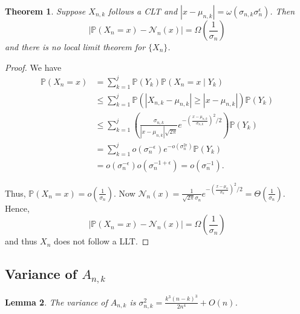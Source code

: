 \documentclass[12pt]{article} %
\newcommand{\p}[1]{\left(#1\right)}
\newcommand{\abs}[1]{\left\lvert#1\right\rvert}
\renewcommand{\P}{\mathbb{P}}
\newtheorem{thm}{Theorem}[section]
\newtheorem{lem}[thm]{Lemma}
\theoremstyle{definition}
\theoremstyle{definition}
\begin{document}
\begin{thm}
Suppose $X_{n,k}$ follows a CLT and $\abs{x - \mu_{n,k}} = \omega(\sigma_{n,k} \sigma_n^{\epsilon})$. Then
\[ \abs{\P(X_n = x) - \mathcal{N}_n(x)} = \Omega\p{\frac{1}{\sigma_n}} \]
and there is no local limit theorem for $\{X_n\}$.
\end{thm}
\begin{proof} We have
\begin{align*}
\P(X_n = x) &= \sum_{k = 1}^j \P(Y_k)\P(X_n = x \mid Y_k) \\
&\leq \sum_{k = 1}^j \P(\abs{X_{n, k}-\mu_{n,k}}\geq \abs{x-\mu_{n,k}}) \P(Y_k) \\
&\leq \sum_{k=1}^j \p{\frac{\sigma_{n,k}}{\abs{x-\mu_{n,k}}\sqrt{2\pi}}e^{-\p{\frac{x-\mu_{n,k}}{\sigma_{n,k}}}^2/2}} \P(Y_k) \\
&= \sum_{k=1}^j {o(\sigma_n^{-\epsilon})e^{-o(\sigma_n^{2\epsilon})} \P(Y_k)} \\
&= o(\sigma_n^{-\epsilon})o(\sigma_n^{-1+\epsilon}) = o(\sigma_n^{-1}).
\end{align*}

Thus, $\P(X_n = x)= o\p{\frac{1}{\sigma_n}}.$ Now $\mathcal{N}_n(x) = \frac{1}{\sqrt{2\pi}\sigma_n} e^{-\p{\frac{x-\mu_n}{\sigma_n}}^2/2} = \Theta\p{\frac{1}{\sigma_n}}$. Hence, \[\abs{\P(X_n = x) - \mathcal{N}_n(x)} = \Omega\p{\frac{1}{\sigma_n}}\] and thus $X_n$ does not follow a LLT. 

\end{proof}


\subsection{Variance of $A_{n,k}$}

\begin{lem}
The variance of $A_{n,k}$ is $\sigma_{n,k}^2 = \frac{k^3(n-k)^3}{2n^4} + O(n)$.
\end{lem}
\end{document}
